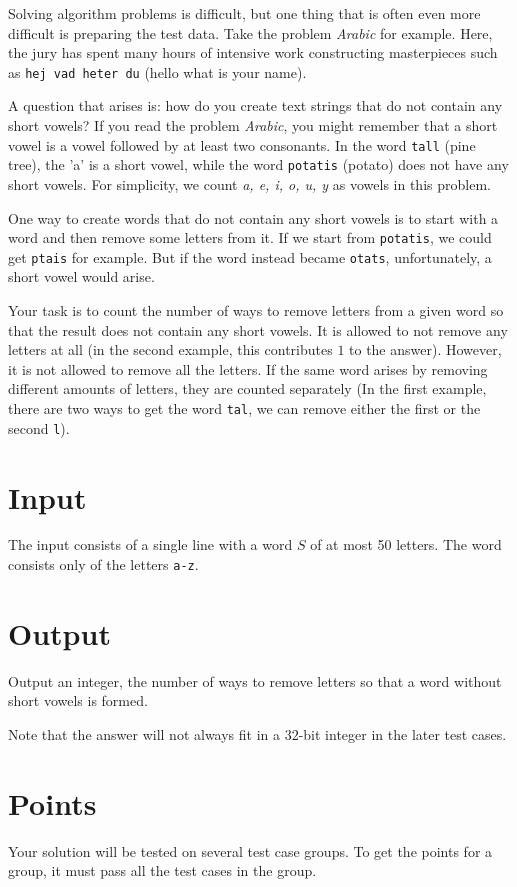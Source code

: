 \noindent
Solving algorithm problems is difficult, but one thing that is often even more difficult is preparing the test data. 
Take the problem \textit{Arabic} for example. Here, the jury has spent many hours of intensive work constructing masterpieces such as \texttt{hej vad heter du} (hello what is your name).

A question that arises is: how do you create text strings that do not contain any short vowels? 
If you read the problem \textit{Arabic}, you might remember that a short vowel is a vowel followed by at least two consonants. 
In the word \texttt{tall} (pine tree), the 'a' is a short vowel, while the word \texttt{potatis} (potato) does not have any short vowels. 
For simplicity, we count \textit{a, e, i, o, u, y} as vowels in this problem.

One way to create words that do not contain any short vowels is to start with a word and then remove some letters from it. If we start from \texttt{potatis}, we could get \texttt{ptais} for example. 
But if the word instead became \texttt{otats}, unfortunately, a short vowel would arise.

Your task is to count the number of ways to remove letters from a given word so that the result does not contain any short vowels. It is allowed to not remove any letters at all (in the second example, this contributes $1$ to the answer). 
However, it is not allowed to remove all the letters. If the same word arises by removing different amounts of letters, they are counted separately (In the first example, there are two ways to get the word \texttt{tal}, we can remove either the first or the second \texttt{l}).

\section*{Input}
The input consists of a single line with a word $S$ of at most 50 letters. The word consists only of the letters \texttt{a-z}.

\section*{Output}
Output an integer, the number of ways to remove letters so that a word without short vowels is formed.

Note that the answer will not always fit in a $32$-bit integer in the later test cases.

\section*{Points}
Your solution will be tested on several test case groups.
To get the points for a group, it must pass all the test cases in the group.

